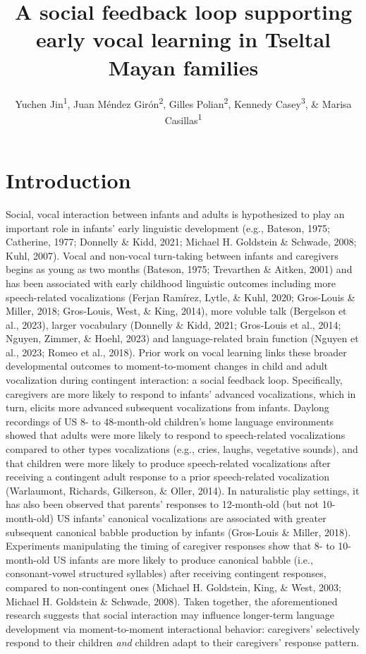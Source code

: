 \documentclass[
  man]{apa6}
\title{A social feedback loop supporting early vocal learning in Tseltal Mayan families}
\author{Yuchen Jin\textsuperscript{1}, Juan Méndez Girón\textsuperscript{2}, Gilles Polian\textsuperscript{2}, Kennedy Casey\textsuperscript{3}, \& Marisa Casillas\textsuperscript{1}}
\date{}
\affiliation{\vspace{0.5cm}\textsuperscript{1} Department of Comparative Human Development, University of Chicago\\\textsuperscript{2} Centro de Investigación y Estudios Superiores en Antropología Social Sureste\\\textsuperscript{3} Department of Psychology, Princeton University}
\begin{document}
\maketitle

\hypertarget{introduction}{%
\section{Introduction}\label{introduction}}

Social, vocal interaction between infants and adults is hypothesized to play an important role in infants' early linguistic development (e.g., Bateson, 1975; Catherine, 1977; Donnelly \& Kidd, 2021; Michael H. Goldstein \& Schwade, 2008; Kuhl, 2007). Vocal and non-vocal turn-taking between infants and caregivers begins as young as two months (Bateson, 1975; Trevarthen \& Aitken, 2001) and has been associated with early childhood linguistic outcomes including more speech-related vocalizations (Ferjan Ramírez, Lytle, \& Kuhl, 2020; Gros-Louis \& Miller, 2018; Gros‐Louis, West, \& King, 2014), more voluble talk (Bergelson et al., 2023), larger vocabulary (Donnelly \& Kidd, 2021; Gros‐Louis et al., 2014; Nguyen, Zimmer, \& Hoehl, 2023) and language-related brain function (Nguyen et al., 2023; Romeo et al., 2018). Prior work on vocal learning links these broader developmental outcomes to moment-to-moment changes in child and adult vocalization during contingent interaction: a social feedback loop. Specifically, caregivers are more likely to respond to infants' advanced vocalizations, which in turn, elicits more advanced subsequent vocalizations from infants. Daylong recordings of US 8- to 48-month-old children's home language environments showed that adults were more likely to respond to speech-related vocalizations compared to other types vocalizations (e.g., cries, laughs, vegetative sounds), and that children were more likely to produce speech-related vocalizations after receiving a contingent adult response to a prior speech-related vocalization (Warlaumont, Richards, Gilkerson, \& Oller, 2014). In naturalistic play settings, it has also been observed that parents' responses to 12-month-old (but not 10-month-old) US infants' canonical vocalizations are associated with greater subsequent canonical babble production by infants (Gros-Louis \& Miller, 2018). Experiments manipulating the timing of caregiver responses show that 8- to 10-month-old US infants are more likely to produce canonical babble (i.e., consonant-vowel structured syllables) after receiving contingent responses, compared to non-contingent ones (Michael H. Goldstein, King, \& West, 2003; Michael H. Goldstein \& Schwade, 2008). Taken together, the aforementioned research suggests that social interaction may influence longer-term language development via moment-to-moment interactional behavior: caregivers' selectively respond to their children \emph{and} children adapt to their caregivers' response pattern.
\end{document}
